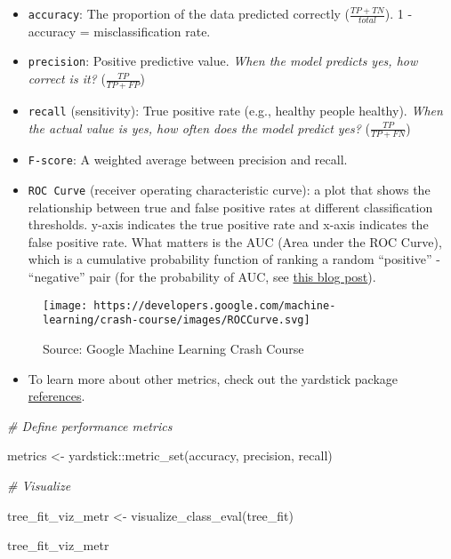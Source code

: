 \documentclass[
]{book}
\newenvironment{Shaded}{\begin{snugshade}}{\end{snugshade}}
\newcommand{\CommentTok}[1]{\textcolor[rgb]{0.56,0.35,0.01}{\textit{#1}}}
\newcommand{\FunctionTok}[1]{\textcolor[rgb]{0.00,0.00,0.00}{#1}}
\newcommand{\NormalTok}[1]{#1}
\newcommand{\OtherTok}[1]{\textcolor[rgb]{0.56,0.35,0.01}{#1}}
\newcommand{\SpecialCharTok}[1]{\textcolor[rgb]{0.00,0.00,0.00}{#1}}
\providecommand{\tightlist}{%
  \setlength{\itemsep}{0pt}\setlength{\parskip}{0pt}}
\begin{document}
\begin{itemize}
\item
  \texttt{accuracy}: The proportion of the data predicted correctly (\(\frac{TP + TN}{total}\)). 1 - accuracy = misclassification rate.
\item
  \texttt{precision}: Positive predictive value. \emph{When the model predicts yes, how correct is it?} (\(\frac{TP}{TP + FP}\))
\item
  \texttt{recall} (sensitivity): True positive rate (e.g., healthy people healthy). \emph{When the actual value is yes, how often does the model predict yes?} (\(\frac{TP}{TP + FN}\))
\item
  \texttt{F-score}: A weighted average between precision and recall.
\item
  \texttt{ROC\ Curve} (receiver operating characteristic curve): a plot that shows the relationship between true and false positive rates at different classification thresholds. y-axis indicates the true positive rate and x-axis indicates the false positive rate. What matters is the AUC (Area under the ROC Curve), which is a cumulative probability function of ranking a random ``positive'' - ``negative'' pair (for the probability of AUC, see \href{https://www.alexejgossmann.com/auc/}{this blog post}).
\end{itemize}

\begin{figure}
\centering
\texttt{[image: https://developers.google.com/machine-learning/crash-course/images/ROCCurve.svg]}
\caption{Source: Google Machine Learning Crash Course}
\end{figure}

\begin{itemize}
\tightlist
\item
  To learn more about other metrics, check out the yardstick package \href{https://yardstick.tidymodels.org/reference/index.html}{references}.
\end{itemize}

\begin{Shaded}
\begin{Highlighting}[]
\CommentTok{\# Define performance metrics }

\NormalTok{metrics }\OtherTok{\textless{}{-}}\NormalTok{ yardstick}\SpecialCharTok{::}\FunctionTok{metric\_set}\NormalTok{(accuracy, precision, recall)}

\CommentTok{\# Visualize}

\NormalTok{tree\_fit\_viz\_metr }\OtherTok{\textless{}{-}} \FunctionTok{visualize\_class\_eval}\NormalTok{(tree\_fit)}

\NormalTok{tree\_fit\_viz\_metr}
\end{Highlighting}
\end{Shaded}
\end{document}

